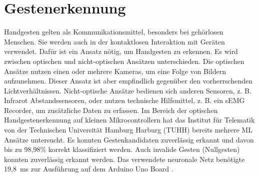\chapter{Gestenerkennung}
Handgesten gelten als Kommunikationsmittel, besonders bei gehörlosen Menschen. Sie werden auch in der kontaktlosen Interaktion mit Geräten verwendet. Dafür ist ein Ansatz nötig, um Handgesten
zu erkennen. Es wird zwischen optischen und nicht-optischen Ansätzen unterschieden. Die optischen Ansätze nutzen einen
oder mehrere Kameras, um eine Folge von Bildern aufzunehmen. Dieser Ansatz ist aber empfindlich gegenüber den vorherrschenden Lichtverhältnissen.
Nicht-optische Ansätze bedienen sich anderen Sensoren, z. B. Infrarot Abstandssensoren, oder nutzen technische Hilfsmittel, z. B. ein sEMG Recorder, um zusätzliche Daten zu erfassen.
\newline
\newline
Im Bereich der optischen Handgestenerkennung auf kleinen Mikrocontrollern hat das Institut für Telematik von der Technischen Universität Hamburg Harburg (TUHH) bereits mehrere ML Ansätze untersucht.
Es konnten Gestenkandidaten zuverlässig erkannt und davon bis zu 98,98\% korrekt klassifiziert werden. Auch invalide Gesten (Nullgesten) konnten zuverlässig erkannt werden. Das verwendete neuronale Netz
benötigte 19,8~ms zur Ausführung auf dem Arduino Uno Board \cite{gieseThesis}.


